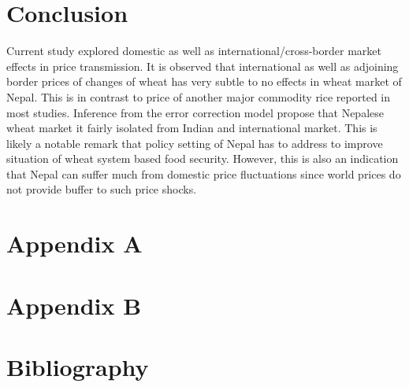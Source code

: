 \documentclass[12pt,]{article}
\begin{document}
\hypertarget{conclusion}{%
\section{Conclusion}\label{conclusion}}

Current study explored domestic as well as international/cross-border market effects in price transmission. It is observed that international as well as adjoining border prices of changes of wheat has very subtle to no effects in wheat market of Nepal. This is in contrast to price of another major commodity rice reported in most studies. Inference from the error correction model propose that Nepalese wheat market it fairly isolated from Indian and international market. This is likely a notable remark that policy setting of Nepal has to address to improve situation of wheat system based food security. However, this is also an indication that Nepal can suffer much from domestic price fluctuations since world prices do not provide buffer to such price shocks.

\hypertarget{appendix-a}{%
\section*{Appendix A}\label{appendix-a}}

\hypertarget{appendix-b}{%
\section*{Appendix B}\label{appendix-b}}

\hypertarget{bibliography}{%
\section*{Bibliography}\label{bibliography}}

\begingroup\fontsize{8}{10}\selectfont
\end{document}
